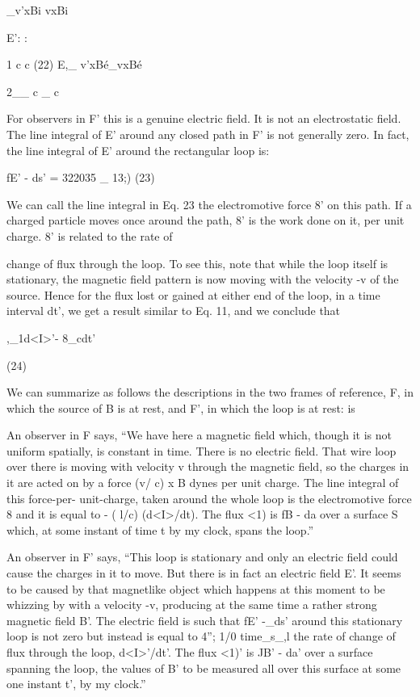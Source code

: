 _v'xBi vxBi

E': :

1 c c (22)
E,_ v'xBé_vxBé

2__ c _ c

For observers in F' this is a genuine electric field. It is not an
electrostatic field. The line integral of E' around any closed path in
F' is not generally zero. In fact, the line integral of E' around the
rectangular loop is:

fE' - ds' = 322035 _ 13;) (23)

We can call the line integral in Eq. 23 the electromotive force 8' on
this path. If a charged particle moves once around the path, 8' is
the work done on it, per unit charge. 8' is related to the rate of

change of flux through the loop. To see this, note that while the loop
itself is stationary, the magnetic field pattern is now moving with the
velocity -v of the source. Hence for the flux lost or gained at either
end of the loop, in a time interval dt', we get a result similar to Eq. 11,
and we conclude that

,_1d<I>'-
8_cdt'

(24)

We can summarize as follows the descriptions in the two frames of
reference, F, in which the source of B is at rest, and F', in which the
loop is at rest: is

An observer in F says, ``We have here a magnetic field which,
though it is not uniform spatially, is constant in time. There is no
electric field. That wire loop over there is moving with velocity v
through the magnetic field, so the charges in it are acted on by a force
(v/ c) x B dynes per unit charge. The line integral of this force-per-
unit-charge, taken around the whole loop is the electromotive force 8
and it is equal to - ( l/c) (d<I>/dt). The flux <1) is fB - da over a surface
S which, at some instant of time t by my clock, spans the loop.''

An observer in F' says, ``This loop is stationary and only an electric
field could cause the charges in it to move. But there is in fact an
electric field E'. It seems to be caused by that magnetlike object
which happens at this moment to be whizzing by with a velocity -v,
producing at the same time a rather strong magnetic field B'. The
electric field is such that fE' -_ds' around this stationary loop is not
zero but instead is equal to 4''; 1/0 time_s_,l the rate of change of flux
through the loop, d<I>'/dt'. The flux <1)' is JB' - da' over a surface
spanning the loop, the values of B' to be measured all over this surface
at some one instant t', by my clock.''

